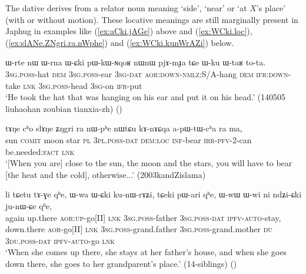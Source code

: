 The dative  derives from a relator noun meaning `side', `near' or `at $X$'s place' (with or without motion). These locative meanings are still marginally present in Japhug in examples like (\ref{ex:aCki.jAGe}) above and (\ref{ex:WCki.loc}), (\ref{ex:slANe.ZNgri.ra.nWphe}) and (\ref{ex:WCki.kunWrAZi}) below.

\begin{exe}
\ex \label{ex:WCki.loc}
\gll  ɯ-rte nɯ ɯ-rna ɯ-ɕki pɯ-kɯ-ɴqoʁ nɯnɯ pjɤ-mɟa tɕe ɯ-ku ɯ-taʁ to-ta. \\
\textsc{3sg}.\textsc{poss}-hat \textsc{dem} \textsc{3sg}.\textsc{poss}-ear \textsc{3sg}-\textsc{dat} \textsc{aor}:\textsc{down}-\textsc{nmlz}:S/A-hang \textsc{dem} \textsc{ifr}:\textsc{down}-take \textsc{lnk} \textsc{3sg}.\textsc{poss}-head \textsc{3sg}-on \textsc{ifr}-put \\
\glt `He took the hat that was hanging on his ear and put it on his head.' (140505 liuhaohan zoubian tianxia-zh)
()
\end{exe}

\begin{exe}
\ex \label{ex:slANe.ZNgri.ra.nWphe}
\gll   tɤŋe cʰo slɤŋe ʑŋgri ra nɯ-pʰe nɯtɕu kɤ-nɤɕqa a-pɯ-tɯ-cʰa ra ma, \\
sun \textsc{comit} moon star \textsc{pl} \textsc{3pl}.\textsc{poss}-\textsc{dat} \textsc{dem}:\textsc{loc} \textsc{inf}-bear \textsc{irr}-\textsc{pfv}-2-can be.needed:\textsc{fact} \textsc{lnk} \\
\glt `[When you are] close to the sun, the moon and the stars, you will have to bear [the heat and the cold], otherwise...' (2003kandZislama)
\end{exe}
 
\begin{exe}
\ex \label{ex:WCki.kunWrAZi}
\gll  li tɕetu tɤ-ɣe qʰe, ɯ-wa ɯ-ɕki ku-nɯ-rɤʑi, tɕeki pɯ-ari qʰe, ɯ-wɯ ɯ-wi ni ndʑi-ɕki ju-nɯ-ɕe qʰe, \\
again up.there \textsc{aor}:\textsc{up}-go[II] \textsc{lnk} \textsc{3sg}.\textsc{poss}-father \textsc{3sg}.\textsc{poss}-\textsc{dat} \textsc{ipfv}-\textsc{auto}-stay, down.there \textsc{aor}-go[II] \textsc{lnk} \textsc{3sg}.\textsc{poss}-grand.father \textsc{3sg}.\textsc{poss}-grand.mother \textsc{du} \textsc{3du}.\textsc{poss}-\textsc{dat} \textsc{ipfv}-\textsc{auto}-go \textsc{lnk}  \\
\glt `When she comes up there, she stays at her father's house, and when she goes down there, she goes to her grandparent's place.' (14-siblings)
()
\end{exe}

